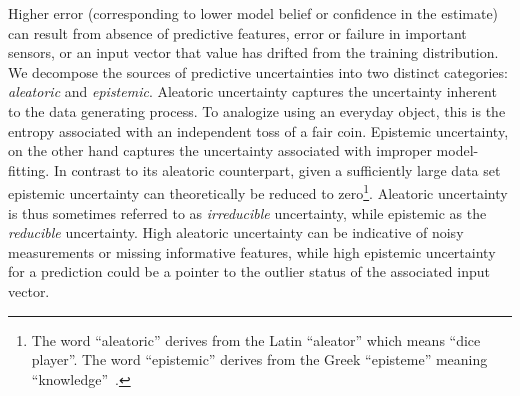 Higher error (corresponding to lower model belief or confidence in the estimate) can result from absence of predictive features, error or failure in important sensors, or an input vector that value has drifted from the training distribution. We decompose the sources of predictive uncertainties into two distinct categories: {\it aleatoric} and {\it epistemic}.
Aleatoric uncertainty captures the uncertainty inherent to the data generating process. To analogize using an everyday object, this is the entropy associated with an independent toss of a fair coin. Epistemic uncertainty, on the other hand captures the uncertainty associated with improper model-fitting. In contrast to its aleatoric counterpart, given a sufficiently large data set epistemic uncertainty can theoretically be reduced to zero\footnote{The word ``aleatoric'' derives from the Latin ``aleator'' which means ``dice player''. The word ``epistemic'' derives from the Greek ``episteme'' meaning ``knowledge''~\citep{gal_thesis}.}. Aleatoric uncertainty is thus sometimes referred to as {\it irreducible} uncertainty, while epistemic as the {\it reducible} uncertainty. High aleatoric uncertainty can be indicative of noisy measurements or missing informative features, while high epistemic uncertainty for a prediction could be a pointer to the outlier status of the associated input vector.







